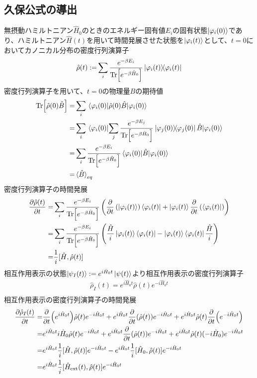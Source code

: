 \documentclass{ltjsarticle}
\begin{document}
\subsection{久保公式の導出}
無摂動ハミルトニアン$\hat{H}_0$のときのエネルギー固有値$E_i$の固有状態$\ket{\varphi_i(0)}$であり、ハミルトニアン$\hat{H}(t)$を用いて時間発展させた状態を$\ket{\varphi_i(t)}$として、$t=0$においてカノニカル分布の密度行列演算子
\begin{align}
  \hat{\rho}(t):=&\sum_i\frac{e^{-\beta E_i}}{\Tr[e^{-\beta\hat{H}_0}]}\ketbra{\varphi_i(t)}\\
\end{align}
密度行列演算子を用いて、$t=0$の物理量$B$の期待値
\begin{align}
  \Tr[\hat{\rho}(0)\hat{B}]=&\sum_i \ev{\hat{\rho}(0)\hat{B}}{\varphi_i(0)}\\
  =&\sum_i \ev{\sum_j\frac{e^{-\beta E_j}}{\Tr[e^{-\beta\hat{H}_0}]}\ketbra{\varphi_j(0)}\hat{B}}{\varphi_i(0)}\\
  =&\sum_i \frac{e^{-\beta E_i}}{\Tr[e^{-\beta\hat{H}_0}]}\ev{\hat{B}}{\varphi_i(0)}\\
  =&\ev*{\hat{B}}_{eq}
\end{align}
密度行列演算子の時間発展
\begin{align}
  \pdv{\hat{\rho}(t)}{t}=&\sum_i\frac{e^{-\beta E_i}}{\Tr[e^{-\beta\hat{H}_0}]}\left(\pdv{t}\left(\ket{\varphi_i(t)}\right)\bra{\varphi_i(t)}+\ket{\varphi_i(t)}\pdv{t}\left(\bra{\varphi_i(t)}\right)\right)\\
  =&\sum_i\frac{e^{-\beta E_i}}{\Tr[e^{-\beta\hat{H}_0}]}\left(\frac{\hat{H}}{i}\ket{\varphi_i(t)}\bra{\varphi_i(t)}-\ket{\varphi_i(t)}\bra{\varphi_i(t)}\frac{\hat{H}}{i}\right)\\
  =&\frac{1}{i}[\hat{H},\hat{\rho}(t)]\\
\end{align}
相互作用表示の状態$\ket{\psi_I(t)}:=e^{i\hat{H}_0t}\ket{\psi(t)}$より相互作用表示の密度行列演算子
\begin{align}
  \hat{\rho}_I(t)=e^{i\hat{H}_0t}\hat{\rho}(t) e^{-i\hat{H}_0t}\\
\end{align}
相互作用表示の密度行列演算子の時間発展
\begin{align}
  \pdv{\hat{\rho}_I(t)}{t}=&\pdv{t}(e^{i\hat{H}_0t})\hat{\rho}(t) e^{-i\hat{H}_0t}+e^{i\hat{H}_0t}\pdv{t}(\hat{\rho}(t)) e^{-i\hat{H}_0t}+e^{i\hat{H}_0t}\hat{\rho}(t) \pdv{t}(e^{-i\hat{H}_0t})\\
  =&e^{i\hat{H}_0t}i\hat{H}_0\hat{\rho}(t) e^{-i\hat{H}_0t}+e^{i\hat{H}_0t}\pdv{t}(\hat{\rho}(t)) e^{-i\hat{H}_0t}+e^{i\hat{H}_0t}\hat{\rho}(t) (-i\hat{H}_0)e^{-i\hat{H}_0t}\\
  =&e^{i\hat{H}_0t}\frac{1}{i}[\hat{H},\hat{\rho}(t)]e^{-i\hat{H}_0t}-e^{i\hat{H}_0t}\frac{1}{i}[\hat{H}_0,\hat{\rho}(t)]e^{-i\hat{H}_0t}\\
  =&e^{i\hat{H}_0t}\frac{1}{i}[\hat{H}_{\textrm{ext}}(t),\hat{\rho}(t)]e^{-i\hat{H}_0t}
\end{align}
\end{document}
